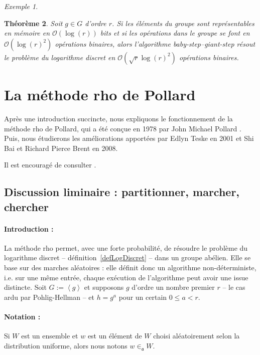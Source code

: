 \documentclass[a4paper, titlepage]{article}
\newtheorem{theo}{Théorème}[section]
\theoremstyle{definition}
\theoremstyle{remark}
\newtheorem{exem}[theo]{Exemple}
\def\O{\mathcal O}
\def\gen #1{\left\langle#1\right\rangle}
\begin{document}
\begin{exem}

\end{exem}

\begin{theo}
Soit $g \in G$ d'ordre $r$. Si les éléments du groupe sont représentables en mémoire en $\O(\log(r))$ bits et si les opérations dans le groupe se font en $\O(\log(r)^2)$ opérations binaires, alors l'algorithme baby-step--giant-step résout le problème du logarithme discret en $\O(\sqrt{r}\log(r)^2)$ opérations binaires.
\end{theo}

\section{La méthode rho de Pollard}

Après une introduction succincte, nous expliquons le fonctionnement de la méthode rho de Pollard, qui a été conçue en 1978 par John Michael Pollard \cite{pollard1978}. Puis, nous étudierons les améliorations apportées par Edlyn Teske \cite{teske2001} en 2001 et Shi Bai et Richard Pierce Brent \cite{bai2008} en 2008. 

Il est encouragé de consulter \cite[section 14, pp. 264]{galbraith2012}.

\subsection{Discussion liminaire : partitionner, marcher, chercher}

\paragraph*{Introduction :} La méthode rho permet, avec une forte probabilité, de résoudre le problème du logarithme discret -- définition~\ref{defLogDiscret} -- dans un groupe abélien. Elle se base sur des marches aléatoires : elle définit donc un algorithme non-déterministe, i.e. sur une même entrée, chaque exécution de l'algorithme peut avoir une issue distincte. Soit $G := \gen{g}$ et supposons $g$ d'ordre un nombre premier $r$ -- le cas ardu par Pohlig-Hellman -- et $h = g^a$ pour un certain $0 \leqslant a < r$. 

\paragraph*{Notation :} Si $W$ est un ensemble et $w$ est un élément de $W$ choisi aléatoirement selon la distribution uniforme, alors nous notons $w \in_{\mathfrak{a}} W$.
\end{document}

